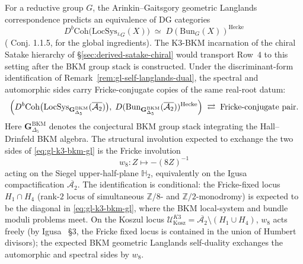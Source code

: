 \begin{remark}[K3-BKM geometric Langlands = Fricke self-duality]
\label{rem:gl-fricke-self-duality}
For a reductive group $G$, the Arinkin--Gaitsgory geometric Langlands
correspondence predicts an equivalence of DG categories
\begin{equation}
\label{eq:gl-arinkin-gaitsgory}
 D^b\mathrm{Coh}\bigl(\mathrm{LocSys}_{{}^LG}(X)\bigr)
 \;\simeq\;
 D(\mathrm{Bun}_G(X))^{\mathrm{Hecke}}
\end{equation}
(\cite{ArinkinGaitsgory2015Singular} Conj. 1.1.5,
\cite{GaitsgoryLurie2019Tamagawa} for the global ingredients). The
K3-BKM incarnation of the chiral Satake hierarchy of
\S\ref{sec:derived-satake-chiral} would transport Row~$4$ to this
setting after the BKM group stack is constructed. Under the
discriminant-form identification of Remark~\ref{rem:gl-self-langlands-dual},
the spectral and automorphic sides carry Fricke-conjugate copies of the
same real-root datum:
\begin{equation}
\label{eq:gl-k3-bkm-gl}
 \Bigl(D^b\mathrm{Coh}\bigl(\mathrm{LocSys}_{\mathbf{G}_{\Delta_5}^{\mathrm{BKM}}}(\overline{\mathcal{A}_2})\bigr),
 \;
 D(\mathrm{Bun}_{\mathbf{G}_{\Delta_5}^{\mathrm{BKM}}}(\overline{\mathcal{A}_2}))^{\mathrm{Hecke}}\Bigr)
 \;\rightleftarrows\;
 \text{Fricke-conjugate pair}.
\end{equation}
Here $\mathbf{G}_{\Delta_5}^{\mathrm{BKM}}$ denotes the conjectural BKM
group stack integrating the Hall--Drinfeld BKM algebra. The structural
involution expected to exchange the two sides of
\eqref{eq:gl-k3-bkm-gl} is the Fricke involution
\begin{equation}
\label{eq:gl-fricke}
 w_8\colon Z \longmapsto -(8Z)^{-1}
\end{equation}
acting on the Siegel upper-half-plane $\mathbb{H}_2$, equivalently on
the Igusa compactification $\overline{\mathcal{A}_2}$. The
identification is conditional: the Fricke-fixed locus $H_1 \cap H_4$ (rank-$2$
locus of simultaneous $\mathbb{Z}/8$- and $\mathbb{Z}/2$-monodromy)
is expected to be the diagonal in \eqref{eq:gl-k3-bkm-gl}, where the
BKM local-system and bundle moduli problems meet. On the Koszul locus
$\mathcal{U}^{K3}_{\mathrm{Kosz}} = \overline{\mathcal{A}_2} \setminus
(H_1 \cup H_4)$, $w_8$ acts freely (by Igusa~\cite{Igusa1962Modular2}
\S3, the Fricke fixed locus is contained in the union of Humbert
divisors); the expected BKM geometric Langlands self-duality exchanges
the automorphic and spectral sides by $w_8$.
\end{remark}

